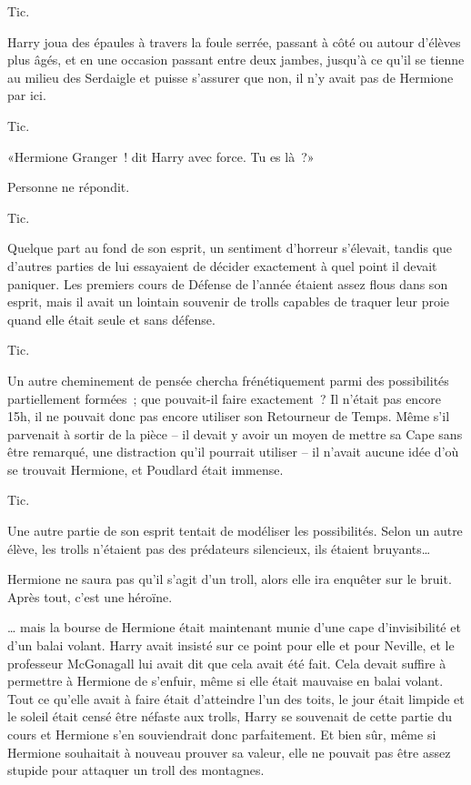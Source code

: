 Tic.

Harry joua des épaules à travers la foule serrée, passant à côté ou autour d'élèves plus âgés, et en une occasion passant entre deux jambes, jusqu'à ce qu'il se tienne au milieu des Serdaigle et puisse s'assurer que non, il n'y avait pas de Hermione par ici.

Tic.

«Hermione Granger~! dit Harry avec force. Tu es là~?»

Personne ne répondit.

Tic.

Quelque part au fond de son esprit, un sentiment d'horreur s'élevait, tandis que d'autres parties de lui essayaient de décider exactement à quel point il devait paniquer. Les premiers cours de Défense de l'année étaient assez flous dans son esprit, mais il avait un lointain souvenir de trolls capables de traquer leur proie quand elle était seule et sans défense.

Tic.

Un autre cheminement de pensée chercha frénétiquement parmi des possibilités partiellement formées~; que pouvait-il faire exactement~? Il n'était pas encore 15h, il ne pouvait donc pas encore utiliser son Retourneur de Temps. Même s'il parvenait à sortir de la pièce -- il devait y avoir un moyen de mettre sa Cape sans être remarqué, une distraction qu'il pourrait utiliser -- il n'avait aucune idée d'où se trouvait Hermione, et Poudlard était immense.

Tic.

Une autre partie de son esprit tentait de modéliser les possibilités. Selon un autre élève, les trolls n'étaient pas des prédateurs silencieux, ils étaient bruyants…

Hermione ne saura pas qu'il s'agit d'un troll, alors elle ira enquêter sur le bruit. Après tout, c'est une héroïne.

… mais la bourse de Hermione était maintenant munie d'une cape d'invisibilité et d'un balai volant. Harry avait insisté sur ce point pour elle et pour Neville, et le professeur McGonagall lui avait dit que cela avait été fait. Cela devait suffire à permettre à Hermione de s'enfuir, même si elle était mauvaise en balai volant. Tout ce qu'elle avait à faire était d'atteindre l'un des toits, le jour était limpide et le soleil était censé être néfaste aux trolls, Harry se souvenait de cette partie du cours et Hermione s'en souviendrait donc parfaitement. Et bien sûr, même si Hermione souhaitait à nouveau prouver sa valeur, elle ne pouvait pas être assez stupide pour attaquer un troll des montagnes.

